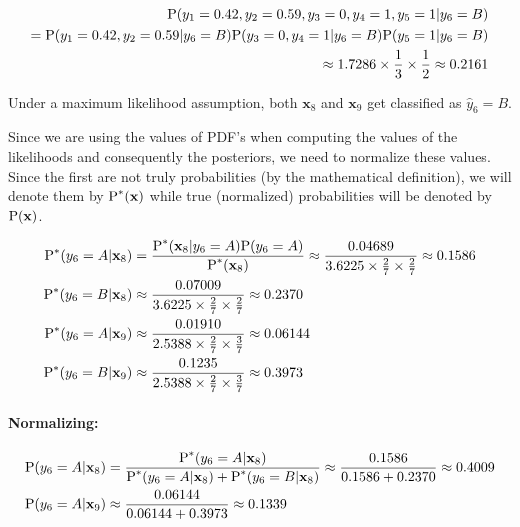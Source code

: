\documentclass[12pt]{article}
\begin{document}
\begin{enumerate}[leftmargin=\labelsep]
\begin{enumerate}
            \begin{equation}
            \begin{split}
                \textrm{P}(y_1 = 0.42, y_2 = 0.59, y_3 = 0, y_4 = 1, y_5 = 1|y_6 = B) \\
                = \textrm{P}(y_1 = 0.42, y_2 = 0.59|y_6 = B)\textrm{P}(y_3 = 0, y_4 = 1|y_6 = B)\textrm{P}(y_5 = 1|y_6 = B) \\
                \approx 1.7286 \times \frac{1}{3} \times \frac{1}{2} \approx 0.2161
            \end{split}
            \end{equation}

            Under a maximum likelihood assumption, both $\mathbf{x}_8$ and $\mathbf{x}_9$ get classified as $\hat{y}_6 = B$.

            Since we are using the values of PDF's when computing the values of the likelihoods and consequently the posteriors, we need to normalize these values. Since the first are not truly probabilities (by the mathematical definition), we will denote them by $\textrm{P}^*(\mathbf{x})$ while true (normalized) probabilities will be denoted by $\textrm{P}(\mathbf{x})$.

            \begin{equation}
            \begin{split}
                \textrm{P}^*(y_6 = A | \mathbf{x}_8) &= \frac{\textrm{P}^*(\mathbf{x}_8 | y_6 = A)\textrm{P}(y_6 = A)}{\textrm{P}^*(\mathbf{x}_8)} \approx \frac{0.04689}{3.6225 \times \frac{2}{7} \times \frac{2}{7}} \approx 0.1586 \\
                \textrm{P}^*(y_6 = B | \mathbf{x}_8) &\approx \frac{0.07009}{3.6225 \times \frac{2}{7} \times \frac{2}{7}} \approx 0.2370 \\
                \textrm{P}^*(y_6 = A | \mathbf{x}_9) &\approx \frac{0.01910}{2.5388 \times \frac{2}{7} \times \frac{3}{7}} \approx 0.06144 \\
                \textrm{P}^*(y_6 = B | \mathbf{x}_9) &\approx \frac{0.1235}{2.5388 \times \frac{2}{7} \times \frac{3}{7}} \approx 0.3973
            \end{split}
            \end{equation}

            \paragraph{Normalizing:}

            \begin{equation}
            \begin{split}
                \textrm{P}(y_6 = A | \mathbf{x}_8) &= \frac{\textrm{P}^*(y_6 = A | \mathbf{x}_8)}{\textrm{P}^*(y_6 = A | \mathbf{x}_8) + \textrm{P}^*(y_6 = B | \mathbf{x}_8)} \approx \frac{0.1586}{0.1586 + 0.2370} \approx 0.4009 \\
                \textrm{P}(y_6 = A | \mathbf{x}_9) &\approx \frac{0.06144}{0.06144 + 0.3973} \approx 0.1339
            \end{split}
            \end{equation}


\end{enumerate}
\end{enumerate}
\end{document}
